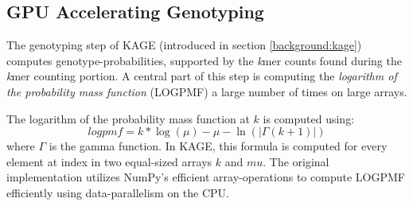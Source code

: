 \subsection{GPU Accelerating Genotyping} \label{methods:gpu_accelerating_genotyping}
The genotyping step of KAGE (introduced in section \ref{background:kage}) computes genotype-probabilities, supported by the \textit{k}mer counts found during the \textit{k}mer counting portion.
A central part of this step is computing the \textit{logarithm of the probability mass function} (LOGPMF) a large number of times on large arrays.

The logarithm of the probability mass function at $k$ is computed using:
\begin{equation} \label{methods:gpu_accelerating_genotyping:equations:logpmf}
  logpmf = k * \log(\mu) - \mu - \ln(|\Gamma(k + 1)|)
\end{equation}
where $\Gamma$ is the gamma function.
In KAGE, this formula is computed for every element at index in two equal-sized arrays $k$ and $mu$.
The original implementation utilizes NumPy's efficient array-operations to compute LOGPMF efficiently using data-parallelism on the CPU.

